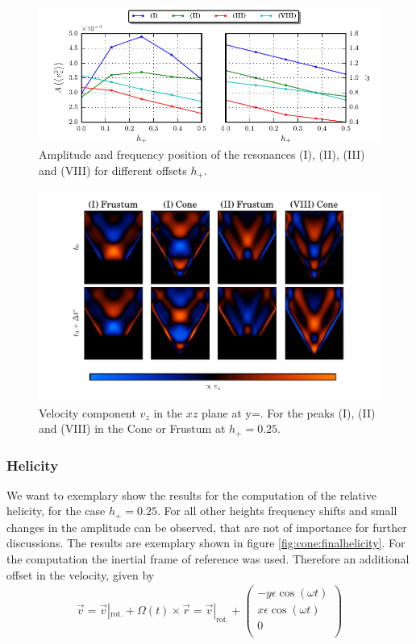 \begin{figure}[!tp]
  \centering
  \includegraphics{gfx/cone/final/amp_pos.pdf}
  \caption{
      \label{fig:cone:finalampmax}
      Amplitude and frequency position of the resonances (\RN{1}), (\RN{2}), (\RN{3}) and (\RN{8})
      for different offsets $h_+$.
    }
\end{figure}
\begin{figure}[!bp]
  \centering
  \includegraphics{gfx/cone/final/modes.pdf}
  \caption{
      \label{fig:cone:finalmodesexp}
      Velocity component $v_z$ in the $xz$ plane at y=.
       For the peaks (\RN{1}), (\RN{2}) and (\RN{8}) in the Cone or Frustum at $h_+=0.25$.
    }
\end{figure}
\clearpage

\subsubsection{Helicity}

We want to exemplary show the results for the computation of the relative helicity, for  the case ${h_+=0.25}$.
For all other heights frequency shifts and small changes in the amplitude can be observed,
that are not of importance for further discussions.
The results are exemplary shown in figure \ref{fig:cone:finalhelicity}.
For the computation the inertial frame of reference was used.
Therefore an additional offset in the velocity,  given by
\begin{align}
    \vec{v} = \vec{v}|_{\text{rot.}} + \Omega(t) \times \vec{r} = \vec{v}|_{\text{rot.}} +
     \begin{pmatrix}
           -y \epsilon \cos(\omega t) \\
           x \epsilon \cos(\omega t) \\
           0\\
         \end{pmatrix}
\end{align}

